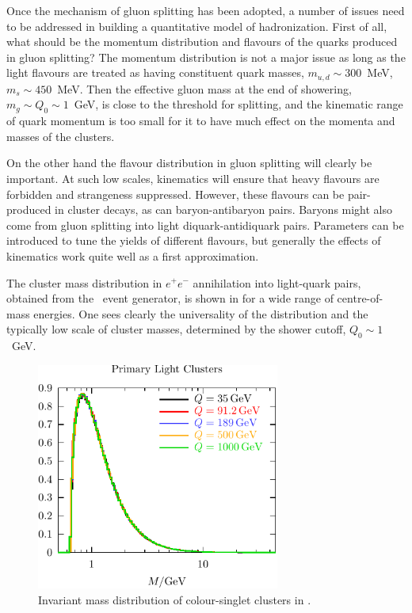 Once the mechanism of gluon splitting has been adopted, a number of
issues need to be addressed in building a quantitative model of
hadronization.  First of all, what should be the momentum distribution
and flavours of the quarks produced in gluon splitting?  The
momentum distribution is not a major issue as long as the
light flavours are treated as having constituent quark masses, $m_{u,d}\sim
300$~MeV, $m_s\sim 450$~MeV.  Then the effective gluon mass at the end
of showering, $m_g\sim Q_0\sim 1$~GeV, is close to the threshold for splitting,
and the kinematic range of quark momentum is too small for it to have 
much effect on the momenta and masses of the clusters.

On the other hand the flavour distribution in gluon splitting will clearly
be important.  At such low scales, kinematics will ensure that heavy flavours are
forbidden and strangeness suppressed.   However, these flavours can be
pair-produced in cluster decays, as can baryon-antibaryon pairs.
Baryons might also come from gluon splitting into light
diquark-antidiquark pairs. Parameters can be introduced to tune the
yields of different flavours, but generally the effects of kinematics
work quite well as a first approximation. 

The cluster mass distribution in $e^+e^-$ annihilation into
light-quark pairs, obtained from the \Herwig\ event generator, is shown in
 for a wide range of  centre-of-mass energies.
One sees clearly the universality of the distribution and the typically
low scale of cluster masses, determined by the shower cutoff,  $Q_0\sim 1$~GeV.

\begin{figure}
\begin{center}\includegraphics[width=8cm]{hadronization/cluster_mass.pdf}\end{center}
\caption{Invariant mass distribution of colour-singlet clusters in \herwig.\label{fig:cluster}}
\end{figure}

